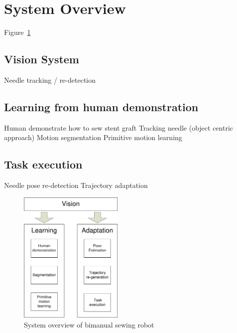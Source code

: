 \section{System Overview}
Figure~\ref{fig:overview}

\subsection{Vision System}
Needle tracking / re-detection

\subsection{Learning from human demonstration}
Human demonstrate how to sew stent graft
Tracking needle (object centric approach)
Motion segmentation
Primitive motion learning

\subsection{Task execution}
Needle pose re-detection
Trajectory adaptation

\begin{figure}
\centering
{
\includegraphics[width=5cm]{./fig/overview.pdf}
\caption{\scriptsize{System overview of bimanual sewing robot}}

\label{fig:overview}
}
\end{figure} 